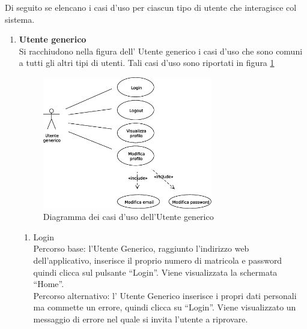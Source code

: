Di seguito se elencano i casi d'uso per ciascun tipo di utente che interagisce col sistema. 
\begin{enumerate}

\item \textbf{Utente generico}\\
Si racchiudono nella figura dell' Utente generico i casi d'uso che sono comuni a tutti gli altri tipi di utenti. Tali casi d'uso sono riportati in figura \ref{use_case_diag_generic}

\begin{figure}[h]
  \caption{Diagramma dei casi d'uso dell'Utente generico}
  \label{use_case_diag_generic}
  \centering
    \includegraphics[width=0.7\textwidth]{images/casi_uso_utente_generico.eps}
\end{figure}

\begin{enumerate}

 \item Login\\ \label{UC_login}
    Percorso base:
    l'Utente Generico, raggiunto l'indirizzo web dell'applicativo, inserisce il proprio numero di matricola e password quindi clicca sul pulsante ``Login''. Viene visualizzata la schermata ``Home''.\\
    Percorso alternativo:
    l' Utente Generico inserisce i propri dati personali ma commette un errore, quindi clicca su ``Login''. Viene visualizzato un messaggio di errore nel quale si invita l'utente a riprovare.
    

\end{enumerate}
\end{enumerate}
